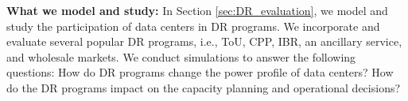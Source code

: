 \textbf{What we model and study:} In Section \ref{sec:DR_evaluation}, we model and study the participation of data centers in DR programs. We incorporate and evaluate several popular DR programs, i.e., ToU, CPP, IBR, an ancillary service, and wholesale markets. We conduct simulations to answer the following questions: How do DR programs change the power profile of data centers? How do the DR programs impact on the capacity planning and operational decisions?